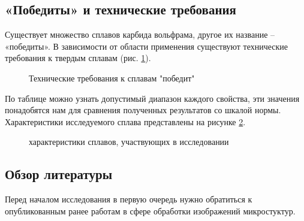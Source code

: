 \documentclass[a4paper, 14pt]{article}
\begin{document}
	\subsection{«Победиты» и технические требования}

	Существует множество сплавов карбида вольфрама, другое их название – «победиты». В зависимости от области применения существуют технические требования к твердым сплавам (рис. \ref{pobedit}).
	
	\begin{figure}[h]
		\caption{Технические требования к сплавам "победит"}
		\label{pobedit}
	\end{figure}
	
	
	По таблице можно узнать допустимый диапазон каждого свойства, эти значения понадобятся нам для сравнения полученных результатов со шкалой нормы. Характеристики исследуемого сплава представлены на рисунке \ref{our_data}.
	
	 \begin{figure}[h]
		\caption{характеристики сплавов, участвующих в исследовании}
		\label{our_data}
	\end{figure}
	
	\subsection{Обзор литературы}
	Перед началом исследования в первую очередь нужно обратиться к опубликованным ранее работам в сфере обработки изображений микростуктур. 
	
\end{document}

